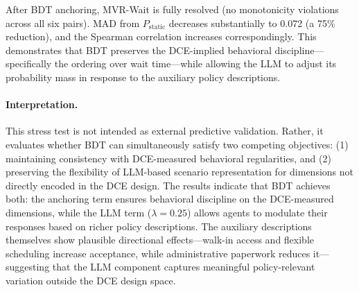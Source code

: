 After BDT anchoring, MVR-Wait is fully resolved (no monotonicity violations across all six pairs). MAD from $P_{\mathrm{static}}$ decreases substantially to 0.072 (a 75\% reduction), and the Spearman correlation increases correspondingly. This demonstrates that BDT preserves the DCE-implied behavioral discipline---specifically the ordering over wait time---while allowing the LLM to adjust its probability mass in response to the auxiliary policy descriptions.

\paragraph{Interpretation.}
This stress test is not intended as external predictive validation. Rather, it evaluates whether BDT can simultaneously satisfy two competing objectives: (1) maintaining consistency with DCE-measured behavioral regularities, and (2) preserving the flexibility of LLM-based scenario representation for dimensions not directly encoded in the DCE design. The results indicate that BDT achieves both: the anchoring term ensures behavioral discipline on the DCE-measured dimensions, while the LLM term ($\lambda = 0.25$) allows agents to modulate their responses based on richer policy descriptions. The auxiliary descriptions themselves show plausible directional effects---walk-in access and flexible scheduling increase acceptance, while administrative paperwork reduces it---suggesting that the LLM component captures meaningful policy-relevant variation outside the DCE design space.
